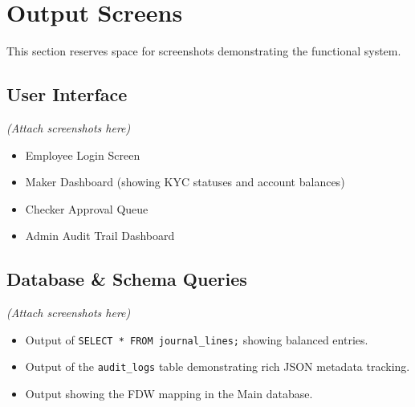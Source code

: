 \chapter{Output Screens}

This section reserves space for screenshots demonstrating the functional system.

\section{User Interface}
\textit{(Attach screenshots here)}
\begin{itemize}
    \item Employee Login Screen
    \item Maker Dashboard (showing KYC statuses and account balances)
    \item Checker Approval Queue
    \item Admin Audit Trail Dashboard
\end{itemize}

\section{Database \& Schema Queries}
\textit{(Attach screenshots here)}
\begin{itemize}
    \item Output of \texttt{SELECT * FROM journal\_lines;} showing balanced entries.
    \item Output of the \texttt{audit\_logs} table demonstrating rich JSON metadata tracking.
    \item Output showing the FDW mapping in the Main database.
\end{itemize}
